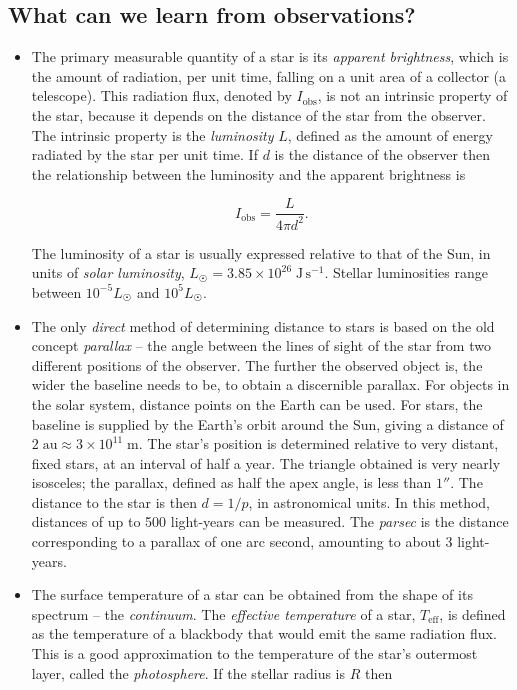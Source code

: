 \documentclass[]{article}
\newcommand{\unit}[1]{\;\mathrm{#1}}
\newcommand{\Sun}{\astrosun}
\begin{document}
\subsection{What can we learn from observations?}
\begin{itemize}
\item The primary measurable quantity of a star is its \emph{apparent
brightness}, which is the amount of radiation, per unit time, falling on a unit
area of a collector (a telescope). This radiation flux, denoted by
$I_{\text{obs}}$, is not an intrinsic property of the star, because it depends
on the distance of the star from the observer. The intrinsic property is the
\emph{luminosity} $L$, defined as the amount of energy radiated by the star per
unit time. If $d$ is the distance of the observer then the relationship between
the luminosity and the apparent brightness is

\begin{equation}
I_{\text{obs}}=\frac{L}{4\pi{d}^2}.
\end{equation}

The luminosity of a star is usually expressed relative to that of the Sun, in
units of \emph{solar luminosity}, $L_{\Sun}=3.85\times10^{26}\unit{J\,s^{-1}}$.
Stellar luminosities range between $10^{-5}L_{\Sun}$ and $10^5L_{\Sun}$.

\item The only \emph{direct} method of determining distance to stars is based on
the old concept \emph{parallax} -- the angle between the lines of sight of the
star from two different positions of the observer. The further the observed
object is, the wider the baseline needs to be, to obtain a discernible parallax.
For objects in the solar system, distance points on the Earth can be used. For
stars, the baseline is supplied by the Earth's orbit around the Sun, giving a
distance of $2\unit{au}\approx3\times10^{11}\unit{m}$. The star's position is
determined relative to very distant, fixed stars, at an interval of half a year.
The triangle obtained is very nearly isosceles; the parallax, defined as half
the apex angle, is less than $1''$. The distance to the star is then $d=1/p$, in
astronomical units. In this method, distances of up to 500 light-years can be
measured. The \emph{parsec} is the distance corresponding to a parallax of one
arc second, amounting to about 3 light-years.

\item The surface temperature of a star can be obtained from the shape of its
spectrum -- the \emph{continuum}. The \emph{effective temperature} of a star,
$T_\text{eff}$, is defined as the temperature of a blackbody that would emit the
same radiation flux. This is a good approximation to the temperature of the
star's outermost layer, called the \emph{photosphere}. If the stellar radius is
$R$ then


\end{itemize}
\end{document}

